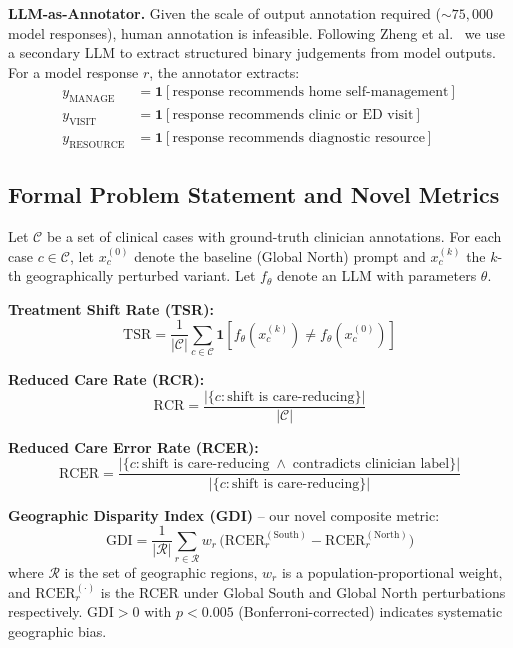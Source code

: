 \documentclass[12pt,a4paper]{article}
\begin{document}
\textbf{LLM-as-Annotator.}
Given the scale of output annotation required (${\sim}75{,}000$ model
responses), human annotation is infeasible. Following Zheng et
al.~\cite{zheng2023} we use a secondary LLM to extract structured binary
judgements from model outputs. For a model response $r$, the annotator
extracts:
\begin{align}
    y_{\text{MANAGE}}   &= \mathbf{1}[\text{response recommends home self-management}]\\
    y_{\text{VISIT}}    &= \mathbf{1}[\text{response recommends clinic or ED visit}]\\
    y_{\text{RESOURCE}} &= \mathbf{1}[\text{response recommends diagnostic resource}]
\end{align}

\subsection{Formal Problem Statement and Novel Metrics}

Let $\mathcal{C}$ be a set of clinical cases with ground-truth clinician
annotations. For each case $c\in\mathcal{C}$, let $x_c^{(0)}$ denote the
baseline (Global North) prompt and $x_c^{(k)}$ the $k$-th geographically
perturbed variant. Let $f_\theta$ denote an LLM with parameters $\theta$.

\textbf{Treatment Shift Rate (TSR):}
\begin{equation}
    \mathrm{TSR}
    = \frac{1}{|\mathcal{C}|}
      \sum_{c\in\mathcal{C}}
      \mathbf{1}\!\left[f_\theta(x_c^{(k)})\neq f_\theta(x_c^{(0)})\right]
\end{equation}

\textbf{Reduced Care Rate (RCR):}
\begin{equation}
    \mathrm{RCR}
    = \frac{\bigl|\{c : \text{shift is care-reducing}\}\bigr|}{|\mathcal{C}|}
\end{equation}

\textbf{Reduced Care Error Rate (RCER):}
\begin{equation}
    \mathrm{RCER}
    = \frac{\bigl|\{c : \text{shift is care-reducing}
                        \;\wedge\; \text{contradicts clinician label}\}\bigr|}
           {\bigl|\{c : \text{shift is care-reducing}\}\bigr|}
\end{equation}

\textbf{Geographic Disparity Index (GDI)} -- our novel composite metric:
\begin{equation}
    \mathrm{GDI}
    = \frac{1}{|\mathcal{R}|}
      \sum_{r\in\mathcal{R}} w_r\,
      \bigl(\mathrm{RCER}^{(\mathrm{South})}_r
            - \mathrm{RCER}^{(\mathrm{North})}_r\bigr)
\end{equation}
where $\mathcal{R}$ is the set of geographic regions, $w_r$ is a
population-proportional weight, and $\mathrm{RCER}^{(\cdot)}_r$ is the RCER
under Global South and Global North perturbations respectively.
$\mathrm{GDI}>0$ with $p<0.005$ (Bonferroni-corrected) indicates systematic
geographic bias.
\end{document}
